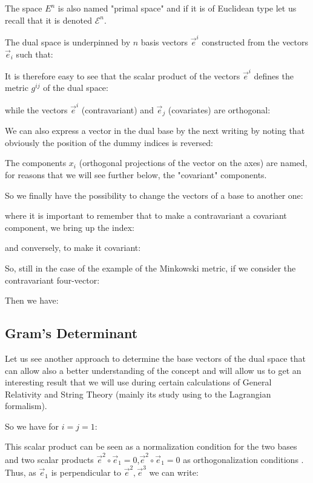 	\begin{tcolorbox}[title=Remark,colframe=black,arc=10pt]
	The space $E^n$ is also named "primal space" and if it is of Euclidean type let us recall that it is denoted $\mathcal{E}^n$.
	\end{tcolorbox}
	The dual space is underpinned by $n$ basis vectors $\vec{e}^i$ constructed from the vectors $\vec{e}_i$ such that:
	
	It is therefore easy to see that the scalar product of the vectors $\vec{e}^i$ defines the metric $g^{ij}$ of the dual space:
	
	while the vectors $\vec{e}^i$ (contravariant) and $\vec{e}_j$ (covariates) are orthogonal:
	
	We can also express a vector in the dual base by the next writing by noting that obviously the position of the dummy indices is reversed:
	
	\begin{tcolorbox}[title=Remark,colframe=black,arc=10pt]
	The components $x_i$ (orthogonal projections of the vector on the axes) are named, for reasons that we will see further below, the "covariant" components.
	\end{tcolorbox}
	So we finally have the possibility to change the vectors of a base to another one:
	
	where it is important to remember that to make a contravariant a covariant  component, we bring up the index:
	
	and conversely, to make it covariant:
	
	So, still in the case of the example of the Minkowski metric, if we consider the contravariant four-vector:
	
	Then we have:
	
	
	\subsection{Gram's Determinant}
	Let us see another approach to determine the base vectors of the dual space that can allow also a better understanding of the concept and will allow us to get an interesting result that we will use during certain calculations of General Relativity and String Theory (mainly its study using to the Lagrangian formalism).
	
	So we have for $i=j=1$:
	
	This scalar product can be seen as a normalization condition for the two bases and two scalar products $\vec{e}^2\circ\vec{e}_1=0$,$\vec{e}^2\circ\vec{e}_1=0$ as orthogonalization conditions . Thus, as $\vec{e}_1$ is perpendicular to $\vec{e}^2,\vec{e}^3$ we can write:
	
